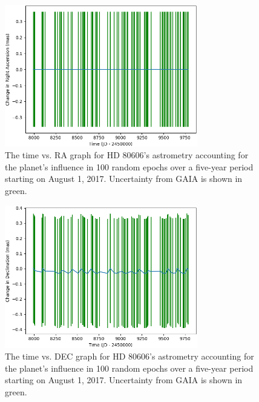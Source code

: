 \documentclass[12pt]{article}
\begin{document}
\begin{figure}[H]
\centering
\includegraphics[width=0.75\textwidth]{planet_time_ra.png}
\vspace{-1em}
\caption{The time vs. RA graph for HD 80606's astrometry accounting for the planet's influence in 100 random epochs over a five-year period starting on August 1, 2017. Uncertainty from GAIA is shown in green.}
\end{figure}
\vspace{-1em}
\begin{figure}[H]
\centering
\includegraphics[width=0.75\textwidth]{planet_time_dec.png}
\vspace{-1em}
\caption{The time vs. DEC graph for HD 80606's astrometry accounting for the planet's influence in 100 random epochs over a five-year period starting on August 1, 2017. Uncertainty from GAIA is shown in green.}
\end{figure}
\vspace{-1em}
\end{document}
